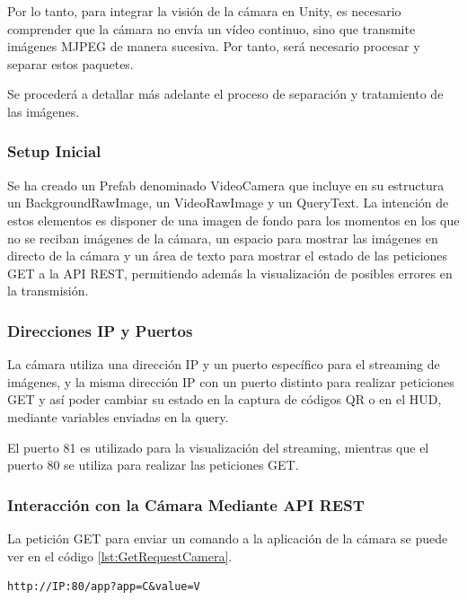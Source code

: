 Por lo tanto, para integrar la visión de la cámara en Unity, es necesario comprender que la cámara no envía un vídeo continuo, sino que transmite imágenes MJPEG de manera sucesiva. Por tanto, será necesario procesar y separar estos paquetes.



Se procederá a detallar más adelante el proceso de separación y tratamiento de las imágenes. 

\subsubsection{Setup Inicial}
\label{subsubsection:initial-setup}

Se ha creado un Prefab denominado VideoCamera que incluye en su estructura un BackgroundRawImage, un VideoRawImage y un QueryText. La intención de estos elementos es disponer de una imagen de fondo para los momentos en los que no se reciban imágenes de la cámara, un espacio para mostrar las imágenes en directo de la cámara y un área de texto para mostrar el estado de las peticiones GET a la API REST, permitiendo además la visualización de posibles errores en la transmisión.

\subsubsection{Direcciones IP y Puertos}

La cámara utiliza una dirección IP y un puerto específico para el streaming de imágenes, y la misma dirección IP con un puerto distinto para realizar peticiones GET y así poder cambiar su estado en la captura de códigos QR o en el HUD, mediante variables enviadas en la query.

El puerto 81 es utilizado para la visualización del streaming, mientras que el puerto 80 se utiliza para realizar las peticiones GET. 

\subsubsection{Interacción con la Cámara Mediante API REST}
La petición GET para enviar un comando a la aplicación de la cámara se puede ver en el código \ref{lst:GetRequestCamera}.

\begin{lstlisting}[style=basicStyle,label={lst:GetRequestCamera}, caption={Petición get para la cámara}]
http://IP:80/app?app=C&value=V
\end{lstlisting}

